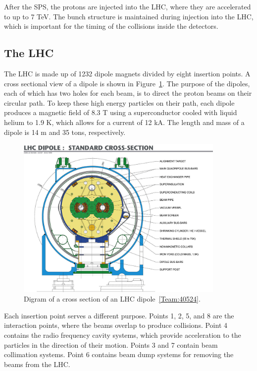After the SPS, the protons are injected into the LHC, where they are accelerated to up to 7 TeV.
The bunch structure is maintained during injection into the LHC, which is important for the timing
of the collisions inside the detectors. 

\subsection{The LHC\label{sec:LHC}}

The LHC is made up of 1232 dipole magnets divided by eight insertion points. A cross sectional view
of a dipole is shown in Figure~\ref{fig:lhc_dipole}. The purpose of the
dipoles, each of which has two holes for each beam, is to direct the proton beams on their circular
path. To keep these high energy particles on their path, each dipole produces a magnetic field
of 8.3 T using a superconductor cooled with liquid helium to 1.9 K, which allows for a current
of 12 kA. The length and mass of a dipole is 14 m and 35 tons, respectively.

\begin{figure}[h]
 \begin{center}
    \includegraphics[width=0.90\textwidth]{figures/experiment/9906025_01.jpeg}
      \end{center}
\caption{Digram of a cross section of an LHC dipole~\ref{Team:40524}.}
\label{fig:lhc_dipole}
\end{figure}

Each insertion point serves a different purpose. Points 1, 2, 5, and 8 are the interaction points, where
the beams overlap to produce collisions. Point 4 contains the radio frequency cavity systems, which
provide acceleration to the particles in the direction of their motion. Points 3 and 7 contain beam
collimation systems. Point 6 contains beam dump systems for removing the beams from the LHC.


